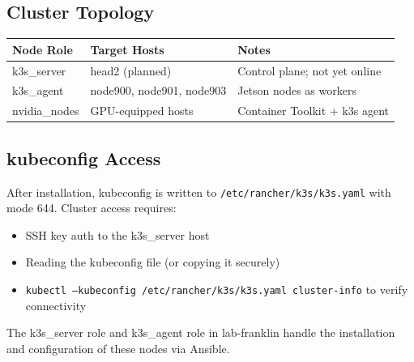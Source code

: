 \subsection{Cluster Topology}

\begin{tabularx}{\textwidth}{l l X}
\textbf{Node Role} & \textbf{Target Hosts} & \textbf{Notes} \\
\hline
k3s\_server & head2 (planned) & Control plane; not yet online\\
k3s\_agent & node900, node901, node903 & Jetson nodes as workers\\
nvidia\_nodes & GPU-equipped hosts & Container Toolkit + k3s agent
\end{tabularx}

\subsection{kubeconfig Access}

After installation, kubeconfig is written to \texttt{/etc/rancher/k3s/k3s.yaml} with mode 644. Cluster access requires:
\begin{itemize}
    \item SSH key auth to the k3s\_server host
    
    \item Reading the kubeconfig file (or copying it securely)
    
    \item \texttt{kubectl --kubeconfig /etc/rancher/k3s/k3s.yaml cluster-info} to verify connectivity
\end{itemize}

The k3s_server role and k3s_agent role in lab-franklin handle the installation and configuration of these nodes via Ansible.
